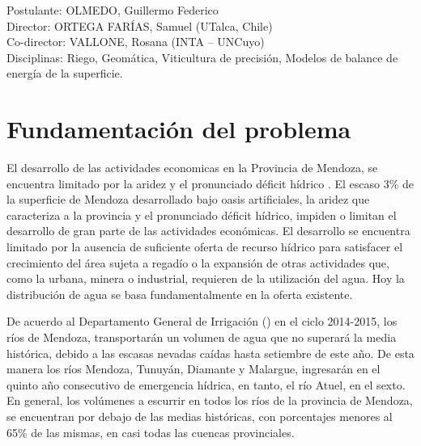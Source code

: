 \documentclass[]{article}
\begin{document}
Postulante: OLMEDO, Guillermo Federico\\
Director: ORTEGA FARÍAS, Samuel (UTalca, Chile)\\ 
Co-director:  VALLONE, Rosana (INTA – UNCuyo)\\
Disciplinas: Riego, Geomática, Viticultura de precisión, Modelos de balance de energía de la superficie.

\section{Fundamentación del problema}




El desarrollo de las actividades economicas en la Provincia de Mendoza, se encuentra limitado por la aridez y el pronunciado déficit hídrico \citep{DGI2014}. El escaso 3\% de la superficie de Mendoza desarrollado bajo oasis artificiales, la aridez que caracteriza a la provincia y el pronunciado déficit hídrico, impiden o limitan el desarrollo de gran parte de las actividades económicas. El desarrollo se encuentra limitado por la ausencia de suficiente oferta de recurso hídrico para satisfacer el crecimiento del área sujeta a regadío o la expansión de otras actividades que, como la urbana, minera o industrial, requieren de la utilización del agua. Hoy la distribución de agua se basa fundamentalmente en la oferta existente. 

De acuerdo al Departamento General de Irrigación (\cite{DGI2014}) en el ciclo 2014-2015, los ríos de Mendoza, transportarán un volumen de agua que no superará la media histórica, debido a las escasas nevadas caídas hasta setiembre de este año. De esta manera los ríos Mendoza, Tunuyán, Diamante y Malargue, ingresarán en el quinto año consecutivo de emergencia hídrica, en tanto, el río Atuel, en el sexto. En general, los volúmenes a escurrir en todos los ríos de la provincia de Mendoza, se encuentran por debajo de las medias históricas, con porcentajes menores al 65\% de  las mismas, en casi todas las cuencas provinciales. 
\end{document}
